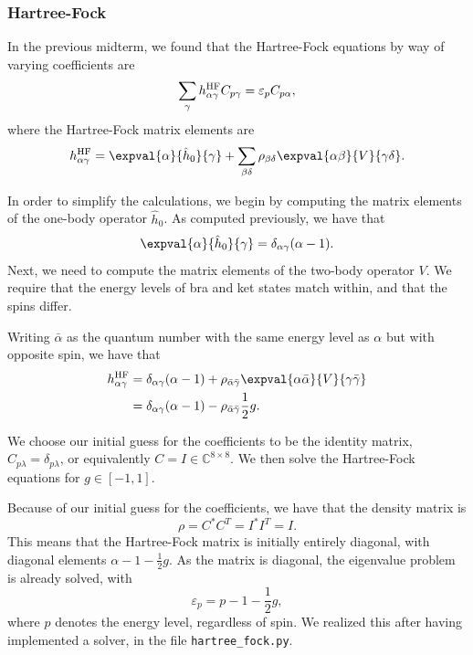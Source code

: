 \subsubsection*{Hartree-Fock}
In the previous midterm, we found that the Hartree-Fock equations by way of varying coefficients are
\begin{equation*}
    \sum_{\gamma} h_{\alpha\gamma}^{\mathrm{HF}} C_{p\gamma} = \varepsilon_p C_{p\alpha},
\end{equation*}
where the Hartree-Fock matrix elements are
\begin{equation*}
    h_{\alpha \gamma}^\HF = \expval{\alpha}{\hat{h}_0}{\gamma} + \sum_{\beta\delta} \rho_{\beta\delta} \expval{\alpha\beta}{V}{\gamma\delta}.
\end{equation*}

In order to simplify the calculations, we begin by computing the matrix elements of the one-body operator $\hat{h}_0$.
As computed previously, we have that
\begin{equation*}
    \expval{\alpha}{\hat{h}_0}{\gamma} = \delta_{\alpha\gamma} (\alpha - 1).
\end{equation*}
Next, we need to compute the matrix elements of the two-body operator $V$.
We require that the energy levels of bra and ket states match within, and that the spins differ.

Writing $\bar{\alpha}$ as the quantum number with the same energy level as $\alpha$ but with opposite spin, we have that
\begin{align*}
    h_{\alpha\gamma}^\HF &= \delta_{\alpha\gamma} (\alpha - 1) + \rho_{\bar{\alpha}\bar{\gamma}} \expval{\alpha\bar{\alpha}}{V}{\gamma\bar{\gamma}} \\
    &= \delta_{\alpha\gamma} (\alpha - 1) - \rho_{\bar{\alpha}\bar{\gamma}} \frac{1}{2} g.
\end{align*}

We choose our initial guess for the coefficients to be the identity matrix, $C_{p\lambda} = \delta_{p\lambda}$, or equivalently $C = I \in \mathbb{C}^{8 \times 8}$.
We then solve the Hartree-Fock equations for $g \in [-1, 1]$.

Because of our initial guess for the coefficients, we have that the density matrix is
\begin{equation*}
    \rho = C^* C^T = I^* I^T = I.
\end{equation*}
This means that the Hartree-Fock matrix is initially entirely diagonal, with diagonal elements $\alpha - 1 - \frac{1}{2} g$.
As the matrix is diagonal, the eigenvalue problem is already solved, with
\begin{equation*}
    \varepsilon_p = p - 1 - \frac{1}{2} g,
\end{equation*}
where $p$ denotes the energy level, regardless of spin.
We realized this after having implemented a solver, in the file \verb|hartree_fock.py|.


